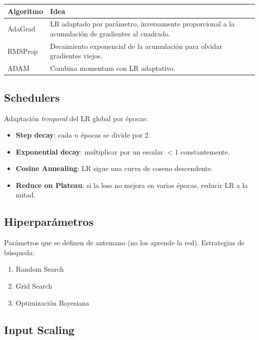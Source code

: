 \documentclass[12pt, a4paper]{article}
\begin{document}
\begin{center}
	\begin{tabular}{lp{9cm}}
		\toprule
		\textbf{Algoritmo} & \textbf{Idea}                                                                                    \\
		\midrule
		AdaGrad            & LR adaptado por parámetro, inversamente proporcional a la acumulación de gradientes al cuadrado. \\
		RMSProp            & Decaimiento exponencial de la acumulación para olvidar gradientes viejos.                        \\
		ADAM               & Combina momentum con LR adaptativo.                                                              \\
		\bottomrule
	\end{tabular}
\end{center}

\subsection{Schedulers}

Adaptación \emph{temporal} del LR global por épocas:
\begin{itemize}
	\item \textbf{Step decay}: cada $n$ épocas se divide por 2.
	\item \textbf{Exponential decay}: multiplicar por un escalar $<1$ constantemente.
	\item \textbf{Cosine Annealing}: LR sigue una curva de coseno descendente.
	\item \textbf{Reduce on Plateau}: si la loss no mejora en varias épocas, reducir LR a la mitad.
\end{itemize}

\subsection{Hiperparámetros}

Parámetros que se definen de antemano (no los aprende la red). Estrategias de búsqueda:
\begin{enumerate}
	\item Random Search
	\item Grid Search
	\item Optimización Bayesiana
\end{enumerate}

\subsection{Input Scaling}
\end{document}
